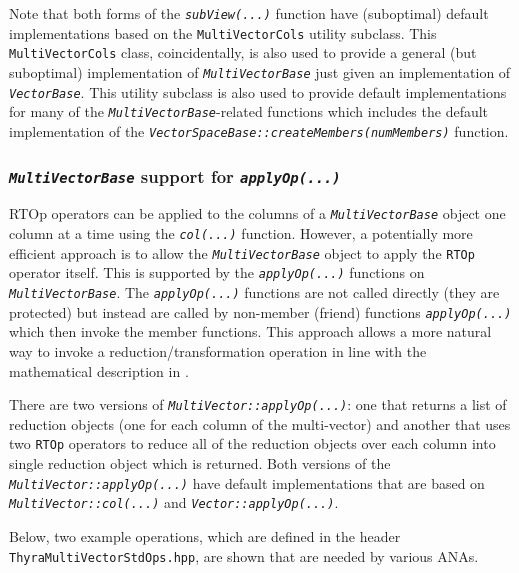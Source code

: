 \documentclass[pdf,ps2pdf,11pt]{SANDreport}
\begin{document}
Note that both forms of the {}\texttt{\textit{subView(...)}} function
have (suboptimal) default implementations based on the
{}\texttt{MultiVectorCols} utility subclass.  This
{}\texttt{MultiVectorCols} class, coincidentally, is also used to
provide a general (but suboptimal) implementation of
{}\texttt{\textit{Multi\-Vector\-Base}} just given an implementation of
{}\texttt{\textit{Vector\-Base}}.  This utility subclass is also used to
provide default implementations for many of the
{}\texttt{\textit{Multi\-Vector\-Base}}-related functions which includes the
default implementation of the
{}\texttt{\textit{Vector\-Space\-Base\-::createMembers(numMembers)}} function.

%
\subsubsection{\texttt{\textit{Multi\-Vector\-Base}} support for {}\texttt{\textit{applyOp(\-...)}}}
\label{tsfcore:sec:multi_vec_apply_op}
%

RTOp operators can be applied to the columns of a
{}\texttt{\textit{Multi\-Vector\-Base}} object one column at a time using
the {}\texttt{\textit{col(...)}} function.  However, a potentially more
efficient approach is to allow the {}\texttt{\textit{Multi\-Vector\-Base}}
object to apply the {}\texttt{RTOp} operator itself.  This is
supported by the {}\texttt{\textit{applyOp(\-...)}} functions on
{}\texttt{\textit{Multi\-Vector\-Base}}.  The
{}\texttt{\textit{applyOp(\-...)}} functions are not called directly
(they are protected) but instead are called by non-member (friend)
functions {}\texttt{\textit{applyOp(\-...)}} which then invoke the
member functions.  This approach allows a more natural way to invoke a
reduction/transformation operation in line with the mathematical
description in {}\cite{ref:rtop_toms}.

There are two versions of
{}\texttt{\textit{Multi\-Vector\-::applyOp(\-...)}}: one that returns
a list of reduction objects (one for each column of the multi-vector)
and another that uses two {}\texttt{RTOp} operators to reduce all of
the reduction objects over each column into single reduction object
which is returned.  Both versions of the
{}\texttt{\textit{Multi\-Vector\-::applyOp(\-...)}} have default
implementations that are based on
{}\texttt{\textit{Multi\-Vector\-::col(...)}} and
{}\texttt{\textit{Vector\-::applyOp(\-...)}}.

Below, two example operations, which are defined in the header
{}\texttt{Thyra\-Multi\-Vector\-Std\-Ops.hpp}, are shown that are
needed by various ANAs.
\end{document}
